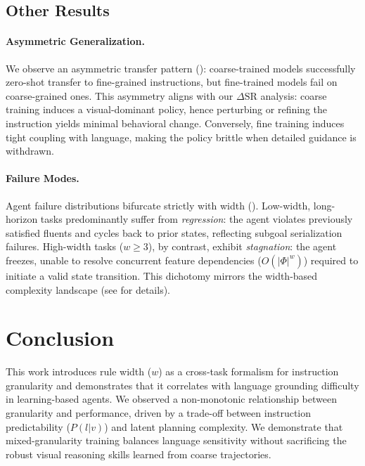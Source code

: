 \documentclass[11pt]{article}
\begin{document}
\subsection{Other Results}
\paragraph{Asymmetric Generalization.} We observe an asymmetric transfer pattern (): coarse-trained models successfully zero-shot transfer to fine-grained instructions, but fine-trained models fail on coarse-grained ones. This asymmetry aligns with our $\Delta\mathrm{SR}$ analysis: coarse training induces a visual-dominant policy, hence perturbing or refining the instruction yields minimal behavioral change. Conversely, fine training induces tight coupling with language, making the policy brittle when detailed guidance is withdrawn.


\paragraph{Failure Modes.} Agent failure distributions bifurcate strictly with width (). Low-width, long-horizon tasks predominantly suffer from \emph{regression}: the agent violates previously satisfied fluents and cycles back to prior states, reflecting subgoal serialization failures. High-width tasks ($w \ge 3$), by contrast, exhibit \emph{stagnation}: the agent freezes, unable to resolve concurrent feature dependencies ($O(|\Phi|^w)$) required to initiate a valid state transition. This dichotomy mirrors the width-based complexity landscape (see  for details).


\section{Conclusion}
\label{sec:conclusion}


This work introduces rule width ($w$) as a cross-task formalism for instruction granularity and demonstrates that it correlates with language grounding difficulty in learning-based agents. We observed a non-monotonic relationship between granularity and performance, driven by a trade-off between instruction predictability ($P(l | v)$) and latent planning complexity. We demonstrate that mixed-granularity training balances language sensitivity without sacrificing the robust visual reasoning skills learned from coarse trajectories.
\end{document}
